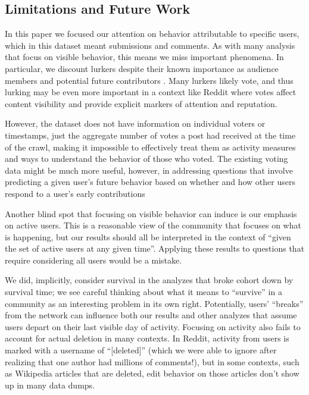 \subsection{Limitations and Future Work}

In this paper we focused our attention on behavior attributable to specific users, which in this dataset meant submissions and comments.  As with many analysis that focus on visible behavior, this means we miss important phenomena.  In particular, we discount lurkers despite their known importance as audience members \cite{Nonnecke2003} and potential future contributors \cite{Ridings2006}.  Many lurkers likely vote, and thus lurking may be even more important in a context like Reddit where votes affect content visibility and provide explicit markers of attention and reputation.  

However, the dataset does not have information on individual voters or timestamps, just the aggregate number of votes a post had received at the time of the crawl, making it impossible to effectively treat them as activity measures and ways to understand the behavior of those who voted.  The existing voting data might be much more useful, however, in addressing questions that involve predicting a given user's future behavior based on whether and how other users respond to a user's early contributions \cite{Joyce2006,Sarkar2012}

Another blind spot that focusing on visible behavior can induce is our emphasis on active users.  This is a reasonable view of the community that focuses on what is happening, but our results should all be interpreted in the context of ``given the set of active users at any given time''.  Applying these results to questions that require considering all users would be a mistake.  

We did, implicitly, consider survival in the analyzes that broke cohort down by survival time; we see careful thinking about what it means to ``survive'' in a community as an interesting problem in its own right.  Potentially, users' ``breaks'' from the network can influence both our results and other analyzes that assume users depart on their last visible day of activity. 
Focusing on activity also fails to account for actual deletion in many contexts.  In Reddit, activity from users is marked with a username of ``[deleted]'' (which we were able to ignore after realizing that one author had millions of comments!), but in some contexts, such as Wikipedia articles that are deleted, edit behavior on those articles don't show up in many data dumps.

